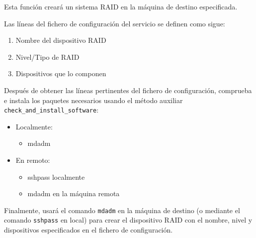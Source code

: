 Esta función creará un sistema RAID en la máquina de destino especificada.

Las líneas del fichero de configuración del servicio se definen como sigue:
\begin{enumerate}
    \item Nombre del dispositivo RAID
    \item Nivel/Tipo de RAID
    \item Dispositivos que lo componen
\end{enumerate}

Después de obtener las líneas pertinentes del fichero de configuración, comprueba e instala los paquetes necesarios usando el método auxiliar \texttt{check\_and\_install\_software}:
\begin{itemize}
    \item Localmente:
    \begin{itemize}
        \item mdadm 
    \end{itemize}
    \item En remoto:
    \begin{itemize}
        \item sshpass localmente
        \item mdadm en la máquina remota
    \end{itemize}
\end{itemize}

Finalmente, usará el comando \texttt{mdadm}\cite{raid} en la máquina de destino (o mediante el comando \texttt{sshpass} en local) para crear el dispositivo RAID con el nombre, nivel y dispositivos especificados en el fichero de configuración.